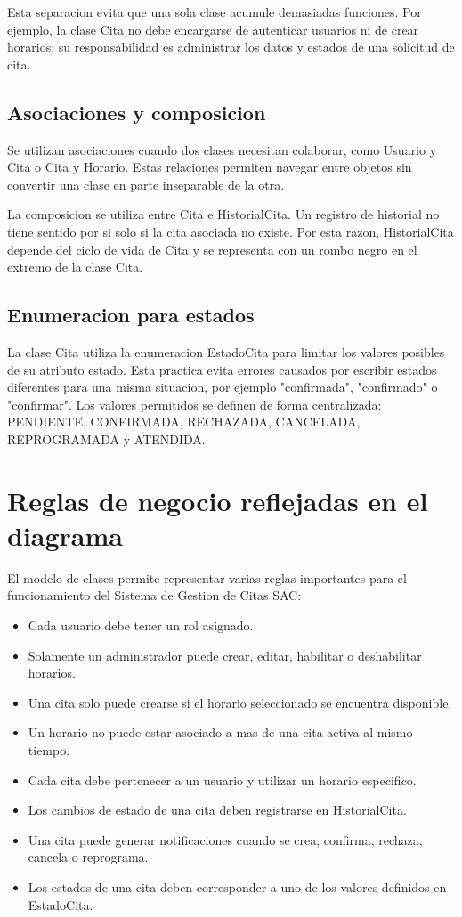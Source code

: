 \documentclass[12pt,letterpaper]{article}
\begin{document}
Esta separacion evita que una sola clase acumule demasiadas funciones. Por ejemplo, la clase Cita no debe encargarse de autenticar usuarios ni de crear horarios; su responsabilidad es administrar los datos y estados de una solicitud de cita.

\subsection{Asociaciones y composicion}

Se utilizan asociaciones cuando dos clases necesitan colaborar, como Usuario y Cita o Cita y Horario. Estas relaciones permiten navegar entre objetos sin convertir una clase en parte inseparable de la otra.

La composicion se utiliza entre Cita e HistorialCita. Un registro de historial no tiene sentido por si solo si la cita asociada no existe. Por esta razon, HistorialCita depende del ciclo de vida de Cita y se representa con un rombo negro en el extremo de la clase Cita.

\subsection{Enumeracion para estados}

La clase Cita utiliza la enumeracion EstadoCita para limitar los valores posibles de su atributo estado. Esta practica evita errores causados por escribir estados diferentes para una misma situacion, por ejemplo "confirmada", "confirmado" o "confirmar". Los valores permitidos se definen de forma centralizada: PENDIENTE, CONFIRMADA, RECHAZADA, CANCELADA, REPROGRAMADA y ATENDIDA.

\section{Reglas de negocio reflejadas en el diagrama}

El modelo de clases permite representar varias reglas importantes para el funcionamiento del Sistema de Gestion de Citas SAC:

\begin{itemize}[leftmargin=1.2cm]
    \item Cada usuario debe tener un rol asignado.
    \item Solamente un administrador puede crear, editar, habilitar o deshabilitar horarios.
    \item Una cita solo puede crearse si el horario seleccionado se encuentra disponible.
    \item Un horario no puede estar asociado a mas de una cita activa al mismo tiempo.
    \item Cada cita debe pertenecer a un usuario y utilizar un horario especifico.
    \item Los cambios de estado de una cita deben registrarse en HistorialCita.
    \item Una cita puede generar notificaciones cuando se crea, confirma, rechaza, cancela o reprograma.
    \item Los estados de una cita deben corresponder a uno de los valores definidos en EstadoCita.
\end{itemize}
\end{document}
